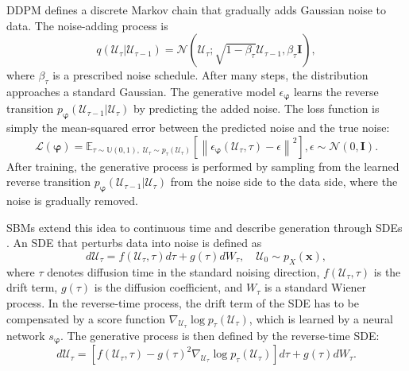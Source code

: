 \ac{DDPM} \citep{ho2020ddpm} defines a discrete Markov chain that gradually adds Gaussian noise to data. The noise-adding process is
\begin{equation}
    q(\mathcal{U}_{\tau}|\mathcal{U}_{\tau-1}) = \mathcal{N}\left( \mathcal{U}_{\tau}; \sqrt{1-\beta_\tau} \mathcal{U}_{\tau-1}, \beta_\tau\boldsymbol{I} \right),
\end{equation}
where $\beta_\tau$ is a prescribed noise schedule. After many steps, the distribution approaches a standard Gaussian. The generative model $\epsilon_{\boldsymbol{\varphi}}$ learns the reverse transition $p_{\boldsymbol{\varphi}}(\mathcal{U}_{\tau-1}|\mathcal{U}_{\tau})$ by predicting the added noise. The loss function is simply the mean-squared error between the predicted noise and the true noise:
\begin{equation}
    \mathcal{L}(\boldsymbol{\varphi}) = \mathbb{E}_{\tau\sim\mathbb{U}(0,1),\;\mathcal{U}_\tau\sim p_\tau(\mathcal{U}_\tau)}\left[\left\|\epsilon_{\boldsymbol{\varphi}}(\mathcal{U}_{\tau},\tau)-\epsilon\right\|^2\right], \epsilon\sim\mathcal{N}(0,\boldsymbol{I}).
\end{equation}
After training, the generative process is performed by sampling from the learned reverse transition $p_{\boldsymbol{\varphi}}(\mathcal{U}_{\tau-1}|\mathcal{U}_{\tau})$ from the noise side to the data side, where the noise is gradually removed.

\acp{SBM} extend this idea to continuous time and describe generation through \acp{SDE} \citep{song2021scorebased}. An \ac{SDE} that perturbs data into noise is defined as
\begin{equation}
    d\mathcal{U}_\tau
    =
    f(\mathcal{U}_\tau,\tau)d\tau
    +
    g(\tau)d\mathit{W}_\tau,
    \quad
    \mathcal{U}_0\sim p_X(\boldsymbol{x}),
\end{equation}
where $\tau$ denotes diffusion time in the standard noising direction, $f(\mathcal{U}_\tau,\tau)$ is the drift term, $g(\tau)$ is the diffusion coefficient, and $\mathit{W}_\tau$ is a standard Wiener process. In the reverse-time process, the drift term of the \ac{SDE} has to be compensated by a score function $\nabla_{\mathcal{U}_\tau}\log p_\tau(\mathcal{U}_\tau)$, which is learned by a neural network $s_{\boldsymbol{\varphi}}$. The generative process is then defined by the reverse-time \ac{SDE}:
\begin{equation}
    d\mathcal{U}_\tau = \left[f(\mathcal{U}_\tau,\tau)-g(\tau)^2\nabla_{\mathcal{U}_\tau}\log p_\tau(\mathcal{U}_\tau)\right]d\tau + g(\tau)d\mathit{W}_\tau.
\end{equation}                                                                                                       

